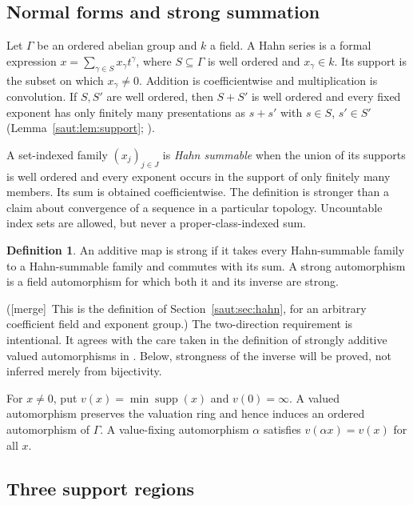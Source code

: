 \documentclass[11pt]{article}
\theoremstyle{definition}
\newtheorem{definition}[theorem]{Definition}
\theoremstyle{remark}
\newcommand{\supp}{\operatorname{supp}}
\newcommand{\mergetag}{\textup{[merge]}}
\numberwithin{equation}{section}
\begin{document}
\subsection{Normal forms and strong summation}

Let $\Gamma$ be an ordered abelian group and $k$ a field. A Hahn series is a formal
expression $x=\sum_{\gamma\in S}x_\gamma t^\gamma$, where $S\subseteq\Gamma$ is well
ordered and $x_\gamma\in k$. Its support is the subset on which $x_\gamma\ne0$.
Addition is coefficientwise and multiplication is convolution. If $S,S'$ are well
ordered, then $S+S'$ is well ordered and every fixed exponent has only finitely
many presentations as $s+s'$ with $s\in S$, $s'\in S'$
(Lemma~\ref{saut:lem:support}; \cite[Lemma~1]{Poonen}).

A set-indexed family $(x_j)_{j\in J}$ is \emph{Hahn summable} when the union of its
supports is well ordered and every exponent occurs in the support of only finitely
many members. Its sum is obtained coefficientwise. The definition is stronger than
a claim about convergence of a sequence in a particular topology. Uncountable index
sets are allowed, but never a proper-class-indexed sum.

\begin{definition}\label{saut:fs:def:strong}
An additive map is strong if it takes every Hahn-summable family to a Hahn-summable
family and commutes with its sum. A strong automorphism is a field automorphism for
which both it and its inverse are strong.
\end{definition}

(\mergetag\ This is the definition of Section~\ref{saut:sec:hahn}, for an arbitrary
coefficient field and exponent group.) The two-direction requirement is intentional. It agrees
with the care taken in the definition of strongly additive valued automorphisms in
\cite[Definition~4.0.5]{KS}. Below, strongness of the inverse will be proved, not
inferred merely from bijectivity.

For $x\ne0$, put $v(x)=\min\supp(x)$ and $v(0)=\infty$. A valued automorphism
preserves the valuation ring and hence induces an ordered automorphism of $\Gamma$.
A value-fixing automorphism $\alpha$ satisfies $v(\alpha x)=v(x)$ for all $x$.

\subsection{Three support regions}
\end{document}
